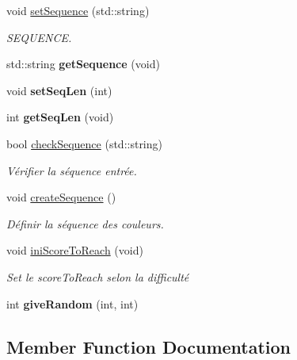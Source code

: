\begin{DoxyCompactItemize}
void \hyperlink{class_mod_simon_a3b031c28072d6564e238daacc254c522}{set\+Sequence} (std\+::string)
\begin{DoxyCompactList}\small\item\em S\+E\+Q\+U\+E\+N\+CE. \end{DoxyCompactList}\item 
\mbox{\label{class_mod_simon_af4468b44e2f45d96ac297b3badf1721a}} 
std\+::string {\bfseries get\+Sequence} (void)
\item 
\mbox{\label{class_mod_simon_a822c4354ab7deb2acb4159b5f0ad9e3e}} 
void {\bfseries set\+Seq\+Len} (int)
\item 
\mbox{\label{class_mod_simon_a7a4e1652d1f2f3f994a91411381dd78a}} 
int {\bfseries get\+Seq\+Len} (void)
\item 
\mbox{\label{class_mod_simon_aa55ab18b884c06ae652dba62326059bc}} 
bool \hyperlink{class_mod_simon_aa55ab18b884c06ae652dba62326059bc}{check\+Sequence} (std\+::string)
\begin{DoxyCompactList}\small\item\em Vérifier la séquence entrée. \end{DoxyCompactList}\item 
\mbox{\label{class_mod_simon_a1c2ab181d2f03d62f44fd837645a8a07}} 
void \hyperlink{class_mod_simon_a1c2ab181d2f03d62f44fd837645a8a07}{create\+Sequence} ()
\begin{DoxyCompactList}\small\item\em Définir la séquence des couleurs. \end{DoxyCompactList}\item 
void \hyperlink{class_mod_simon_a01de269fc7beadbe1199c233ba24ada4}{ini\+Score\+To\+Reach} (void)
\begin{DoxyCompactList}\small\item\em Set le score\+To\+Reach selon la difficulté \end{DoxyCompactList}\item 
\mbox{\label{class_mod_simon_afc89d421c3275fb5e0403c7ee40b0c9a}} 
int {\bfseries give\+Random} (int, int)
\end{DoxyCompactItemize}


\subsection{Member Function Documentation}
\mbox{\label{class_mod_simon_a01de269fc7beadbe1199c233ba24ada4}} 

